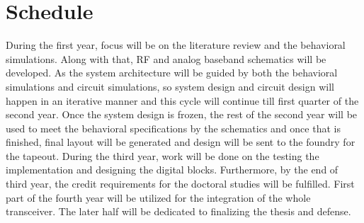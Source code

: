 \documentclass[onecolumn,draftcls,journal]{IEEEtran}
\begin{document}
% 
% 

\IEEEpubidadjcol
\vspace{-.2in}
\section{Schedule}
\vspace{-.1in}
During the first year, focus will be on the literature review and the behavioral simulations. Along with that, RF and analog baseband schematics will be developed. As the system architecture will be guided by both the behavioral simulations and circuit simulations, so system design and circuit design will happen in an iterative manner and this cycle will continue till first quarter of the second year. Once the system design is frozen, the rest of the second year will be used to meet the behavioral specifications by the schematics and once that is finished, final layout will be generated and design will be sent to the foundry for the tapeout.  During the third year, work will be done on the testing the implementation and designing the digital blocks. Furthermore, by the end of third year, the credit requirements for the doctoral studies will be fulfilled. First part of the fourth year will be utilized for the integration of the whole transceiver. The later half will be dedicated to finalizing the thesis and defense.
\end{document}
